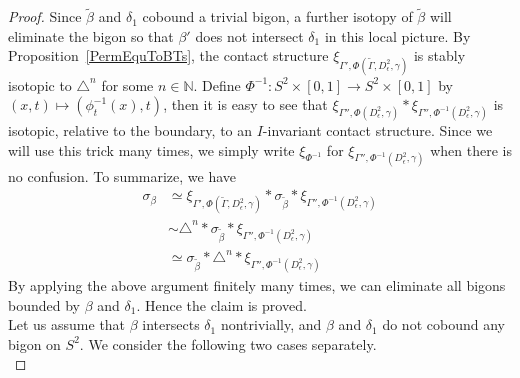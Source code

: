 \documentclass[12pt]{amsart}
\theoremstyle{remark}
\begin{document}
\begin{proof}
Since $\tilde\beta$ and $\delta_1$ cobound a trivial bigon, a further isotopy of $\tilde\beta$ will eliminate the bigon so that $\beta'$ does not intersect $\delta_1$ in this local picture. By Proposition~\ref{PermEquToBTs}, the contact structure $\xi_{\Gamma',\Phi(\tilde\Gamma,D^2_\epsilon,\gamma)}$ is stably isotopic to $\triangle^n$ for some $n\in\mathbb{N}$. Define $\Phi^{-1}:S^2\times[0,1] \to S^2\times[0,1]$ by $(x,t) \mapsto (\phi^{-1}_t(x),t)$, then it is easy to see that $\xi_{\Gamma'',\Phi(D^2_\epsilon,\gamma)}\ast\xi_{\Gamma'',\Phi^{-1}(D^2_\epsilon,\gamma)}$ is isotopic, relative to the boundary, to an $I$-invariant contact structure. Since we will use this trick many times, we simply write $\xi_{\Phi^{-1}}$ for $\xi_{\Gamma'',\Phi^{-1}(D^2_\epsilon,\gamma)}$ when there is no confusion. To summarize, we have
\begin{align*}
\sigma_\beta &\simeq \xi_{\Gamma',\Phi(\tilde\Gamma,D^2_\epsilon,\gamma)} \ast \sigma_{\tilde\beta} \ast \xi_{\Gamma'',\Phi^{-1}(D^2_\epsilon,\gamma)}\\
             &\sim \triangle^n \ast \sigma_{\tilde\beta} \ast \xi_{\Gamma'',\Phi^{-1}(D^2_\epsilon,\gamma)}\\
             &\simeq \sigma_{\tilde\beta} \ast \triangle^n \ast \xi_{\Gamma'',\Phi^{-1}(D^2_\epsilon,\gamma)}
\end{align*}
By applying the above argument finitely many times, we can eliminate all bigons bounded by $\beta$ and $\delta_1$. Hence the claim is proved.\\

Let us assume that $\beta$ intersects $\delta_1$ nontrivially, and $\beta$ and $\delta_1$ do not cobound any bigon on $S^2$. We consider the following two cases separately.\\


\end{proof}
\end{document}
